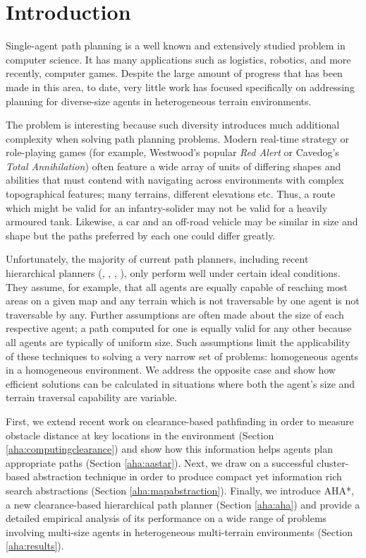 \section{Introduction}
Single-agent path planning is a well known and extensively studied problem in computer science.
It has many applications such as logistics, robotics, and more recently, computer games. 
Despite the large amount of progress that has been made in this area, to date, very little work has focused specifically on addressing planning for diverse-size agents in heterogeneous terrain environments. 
\par \indent
The problem is interesting because such diversity introduces much additional complexity when solving path planning problems.
Modern real-time strategy or role-playing games (for example, Westwood's popular \emph{Red Alert} or Cavedog's \emph{Total Annihilation}) often feature a wide array of units of differing shapes and abilities that must contend with navigating across environments with complex topographical features; many terrains, different elevations etc. 
Thus, a route which might be valid for an infantry-solider may not be valid for a heavily armoured tank. 
Likewise, a car and an off-road vehicle may be similar in size and shape but the paths preferred by each one could differ greatly. 
\par \indent
Unfortunately, the majority of current path planners, including recent hierarchical planners (\cite{botea04}, \cite{sturtevant05}, \cite{demyen07}, \cite{geraerts07}), only perform well under certain ideal conditions. 
They assume, for example, that all agents are equally capable of reaching most areas on a given map and any terrain which is not traversable by one agent is not traversable by any. 
Further assumptions are often made about the size of each respective agent; a path computed for one is equally valid for any other because all agents are typically of uniform size. 
Such assumptions limit the applicability of these techniques to solving a very narrow set of problems: homogeneous agents in a homogeneous environment. 
We address the opposite case and show how efficient solutions can be calculated in situations where both the agent's size and terrain traversal capability are variable. 
\par \indent
First, we extend recent work on clearance-based pathfinding \cite{geraerts07} in order to measure obstacle distance at key locations in the environment (Section \ref{aha:computingclearance}) and show how this information helps agents plan appropriate paths (Section \ref{aha:aastar}). 
Next, we draw on a successful cluster-based abstraction technique \cite{botea04} in order to produce compact yet information rich search abstractions (Section \ref{aha:mapabstraction}). 
Finally, we introduce AHA*, a new clearance-based hierarchical path planner (Section \ref{aha:aha}) and provide a detailed empirical analysis of its performance on a wide range of problems involving multi-size agents in heterogeneous multi-terrain environments (Section \ref{aha:results}).
